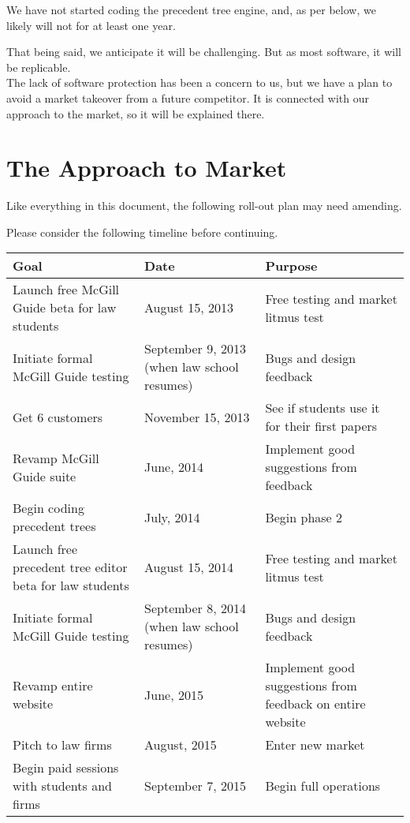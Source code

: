 \documentclass[11pt]{article}
\begin{document}
We have not started coding the precedent tree engine, and, as per below, we likely will not for at least one year.

That being said, we anticipate it will be challenging. But as most software, it will be replicable. \\

The lack of software protection has been a concern to us, but we have a plan to avoid a market takeover from a future competitor. It is connected with our approach to the market, so it will be explained there.

\section*{The Approach to Market}

Like everything in this document, the following roll-out plan may need amending.

Please consider the following timeline before continuing.

\begin{table}[htdp]
\begin{center}
\begin{tabular}{ L{3cm} | L{3cm} | L{3cm} }
\textbf{Goal} & \textbf{Date}& \textbf{Purpose}\\
\hline
\hline
Launch free McGill Guide beta for law students & August 15, 2013 & Free testing and market litmus test\\
\hline
Initiate formal McGill Guide testing & September 9, 2013 (when law school resumes) & Bugs and design feedback \\
\hline
Get 6 customers & November 15, 2013 & See if students use it for their first papers\\
\hline
Revamp McGill Guide suite & June, 2014 & Implement good suggestions from feedback\\
\hline
Begin coding precedent trees & July, 2014 & Begin phase 2\\
\hline 
Launch free precedent tree editor beta for law students & August 15, 2014 & Free testing and market litmus test\\
\hline
Initiate formal McGill Guide testing & September 8, 2014 (when law school resumes) & Bugs and design feedback \\
\hline
Revamp entire website & June, 2015 & Implement good suggestions from feedback on entire website\\
\hline
Pitch to law firms & August, 2015 & Enter new market\\
\hline
Begin paid sessions with students and firms & September 7, 2015 & Begin full operations\\
\end{tabular}
\end{center}
\label{Timeline}
\end{table}%
\end{document}
